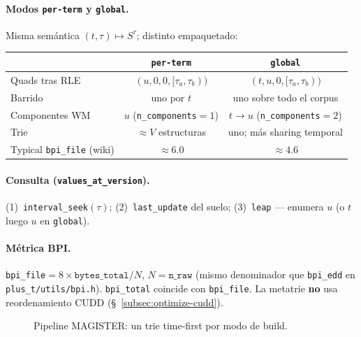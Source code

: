 \paragraph{Modos \texttt{per-term} y \texttt{global}.}
Misma semántica $(t,\tau)\mapsto S^\tau$; distinto empaquetado:
\begin{center}
\small
\begin{tabular}{lcc}
\hline
 & \texttt{per-term} & \texttt{global} \\
\hline
Quads tras RLE & $(u,0,0,[\tau_a,\tau_b))$ & $(t,u,0,[\tau_a,\tau_b))$ \\
Barrido & uno por $t$ & uno sobre todo el corpus \\
Componentes WM & $u$ (\texttt{n\_components}$=1$) &
  $t\to u$ (\texttt{n\_components}$=2$) \\
Trie & $\approx V$ estructuras & uno; más sharing temporal \\
Typical \texttt{bpi\_file} (wiki) & $\approx 6.0$ & $\approx 4.6$ \\
\hline
\end{tabular}
\end{center}

\paragraph{Consulta (\texttt{values\_at\_version}).}
(1)~\texttt{interval\_seek}$(\tau)$;
(2)~\texttt{last\_update} del suelo;
(3)~\texttt{leap} --- enumera $u$ (o $t$ luego $u$ en \texttt{global}).

\paragraph{Métrica BPI.}
\texttt{bpi\_file}$=8\times\texttt{bytes\_total}/N$, $N=\texttt{n\_raw}$
(mismo denominador que \texttt{bpi\_edd} en \texttt{plus\_t/utils/bpi.h}).
\texttt{bpi\_total} coincide con \texttt{bpi\_file}.
La metatrie \textbf{no} usa reordenamiento CUDD (§~\ref{subsec:optimize-cudd}).

\begin{figure}[htbp]
\centering
{}
\caption{Pipeline MAGISTER: un trie time-first por modo de build.}
\label{fig:metatrie-pipeline}
\end{figure}

